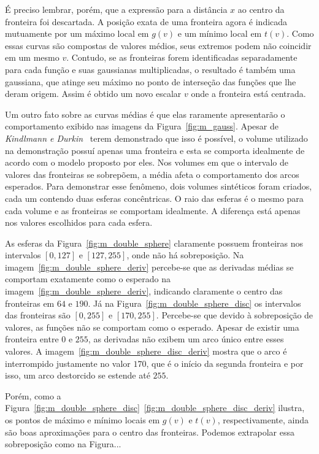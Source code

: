 	É preciso lembrar, porém, que a expressão para a distância $ x $ ao centro da fronteira foi descartada. A posição exata de uma fronteira agora é indicada mutuamente por um máximo local em $ g(v) $ e um mínimo local em $ t(v) $. Como essas curvas são compostas de valores médios, seus extremos podem não coincidir em um mesmo $ v $. Contudo, se as fronteiras forem identificadas separadamente para cada função e suas gaussianas multiplicadas, o resultado é também uma gaussiana, que atinge seu máximo no ponto de interseção das funções que lhe deram origem. Assim é obtido um novo escalar $ v $ onde a fronteira está centrada.

	Um outro fato sobre as curvas médias é que elas raramente apresentarão o comportamento exibido nas imagens da Figura~\ref{fig:m_gauss}. Apesar de \textit{Kindlmann e Durkin}~\cite{gordon} terem demonstrado que isso é possível, o volume utilizado na demonstração possuí apenas uma fronteira e esta se comporta idealmente de acordo com o modelo proposto por eles. Nos volumes em que o intervalo de valores das fronteiras se sobrepõem, a média afeta o comportamento dos arcos esperados. Para demonstrar esse fenômeno, dois volumes sintéticos foram criados, cada um contendo duas esferas concêntricas. O raio das esferas é o mesmo para cada volume e as fronteiras se comportam idealmente. A diferença está apenas nos valores escolhidos para cada esfera.
	
	As esferas da Figura~\ref{fig:m_double_sphere} claramente possuem fronteiras nos intervalos $ [0,127] $ e $ [127,255] $, onde não há sobreposição. Na imagem~\ref{fig:m_double_sphere_deriv} percebe-se que as derivadas médias se comportam exatamente como o esperado na imagem~\ref{fig:m_double_sphere_deriv}, indicando claramente o centro das fronteiras em $ 64 $ e $ 190 $. Já na Figura~\ref{fig:m_double_sphere_disc} os intervalos das fronteiras são $ [0,255] $ e $ [170,255] $. Percebe-se que devido à sobreposição de valores, as funções não se comportam como o esperado. Apesar de existir uma fronteira entre $ 0 $ e $ 255 $, as derivadas não exibem um arco único entre esses valores. A imagem~\ref{fig:m_double_sphere_disc_deriv} mostra que o arco é interrompido justamente no valor $ 170 $, que é o início da segunda fronteira e por isso, um arco destorcido se estende até $ 255 $.
	
	Porém, como a Figura~\ref{fig:m_double_sphere_disc}~\ref{fig:m_double_sphere_disc_deriv} ilustra, os pontos de máximo e mínimo locais em $ g(v) $ e $ t(v) $, respectivamente, ainda são boas aproximações para o centro das fronteiras. Podemos extrapolar essa sobreposição como na Figura...
	
